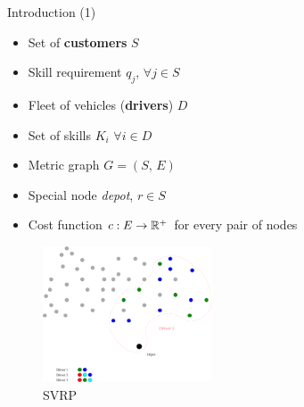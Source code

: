 \begin{frame}[t]{Introduction (1)}
    \begin{minipage}[t]{0.48\textwidth}
        \begin{itemize}
            \item Set of \textbf{customers} $S$
            \item Skill requirement $q_j$,  $\forall j \in S$
            \item Fleet of vehicles (\textbf{drivers}) $D$
            \item Set of skills $K_i$ $\forall i \in D$
            \item Metric graph $G = (S, \, E)$
            \item Special node \emph{depot}, $r \in S$
            \item Cost function $c:E \rightarrow \mathbb{R}^+$ for every pair of nodes
        \end{itemize}
    \end{minipage}
    \begin{minipage}[t]{0.48\textwidth}
        \begin{figure}
            \centering
            \includegraphics[width=5cm]{VRPSS02.pdf}
            \caption{SVRP}
            \label{fig:VRPSS02}
        \end{figure}            
    \end{minipage}    
\end{frame}

